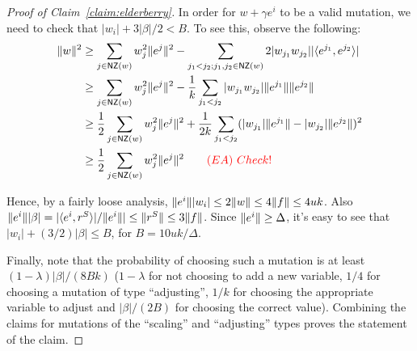 \begin{proof}[Proof of Claim~\ref{claim:elderberry}]
In order for $w + \gamma e^i$ to be a valid mutation, we need to check that
$|w_i| + 3 |\beta|/2 < B$. To see this, observe the following:
\begin{align*}
\Vert w \Vert^2 &\geq \sum_{j \in \mathsf{NZ}(w)} w_j^2 \Vert e^j \Vert^2 - \sum_{j_1 < j_2; j_1,
j_2 \in \mathsf{NZ}(w)} 2 |w_{j_1} w_{j_2}| |\langle e^{j_1}, e^{j_2} \rangle| \\
&\geq \sum_{j \in \mathsf{NZ}(w)} w_j^2 \Vert e^j \Vert^2 - \frac{1}{k} \sum_{j_1 < j_2}
|w_{j_1} w_{j_2}| \Vert e^{j_1} \Vert\Vert e^{j_2} \Vert \\
&\geq \frac{1}{2} \sum_{j \in \mathsf{NZ}(w)} w_j^2 \Vert e^j \Vert^2 + \frac{1}{2k} \sum_{j_1 < j_2}
(|w_{j_1}| \Vert e^{j_1} \Vert - |w_{j_2}| \Vert e^{j_2} \Vert)^2 \\
&\geq \frac{1}{2} \sum_{j \in \mathsf{NZ}(w)} w_j^2 \Vert e^j \Vert^2 \qquad {\color{red} (EA) ~Check!}
\end{align*}

\noindent Hence, by a fairly loose analysis, $\Vert e^i \Vert |w_i| \leq 2 \Vert w \Vert
\leq 4 \Vert f \Vert \leq 4uk$. Also $\Vert e^i \Vert |\beta| =
|\langle e^i, r^S \rangle|/\Vert e^i \Vert| \leq \Vert r^S \Vert \leq 3 \Vert f \Vert$.  Since
$\Vert e^i \Vert \geq \Delta$, it's easy to see that $|w_i| + (3/2) |\beta| \leq
B$, for $B = 10 uk/\Delta$.

Finally, note that the probability of choosing such a mutation is at least $(1 -
\lambda)|\beta|/(8Bk)$ ($1 - \lambda$ for not choosing to add a new variable,
$1/4$ for choosing a mutation of type ``adjusting'', $1/k$ for choosing the
appropriate variable to adjust and $|\beta|/(2B)$ for choosing the correct
value). Combining the claims for mutations of the ``scaling'' and ``adjusting''
types proves the statement of the claim.
\end{proof}

